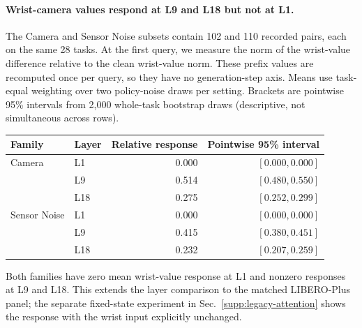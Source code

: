 \paragraph{Wrist-camera values respond at L9 and L18 but not at L1.}
The Camera and Sensor Noise subsets contain 102 and 110 recorded pairs, each on the same 28 tasks. At the first query, we measure the norm of the wrist-value difference relative to the clean wrist-value norm. These prefix values are recomputed once per query, so they have no generation-step axis. Means use task-equal weighting over two policy-noise draws per setting. Brackets are pointwise 95\% intervals from 2,000 whole-task bootstrap draws (descriptive, not simultaneous across rows).

\begin{center}\small
\begin{tabular}{llrr}\toprule
Family & Layer & Relative response & Pointwise 95\% interval\\\midrule
Camera & L1 & 0.000 & $[0.000,0.000]$\\
 & L9 & 0.514 & $[0.480,0.550]$\\
 & L18 & 0.275 & $[0.252,0.299]$\\
Sensor Noise & L1 & 0.000 & $[0.000,0.000]$\\
 & L9 & 0.415 & $[0.380,0.451]$\\
 & L18 & 0.232 & $[0.207,0.259]$\\\bottomrule
\end{tabular}
\end{center}
Both families have zero mean wrist-value response at L1 and nonzero responses at L9 and L18. This extends the layer comparison to the matched LIBERO-Plus panel; the separate fixed-state experiment in Sec.~\ref{supp:legacy-attention} shows the response with the wrist input explicitly unchanged.
